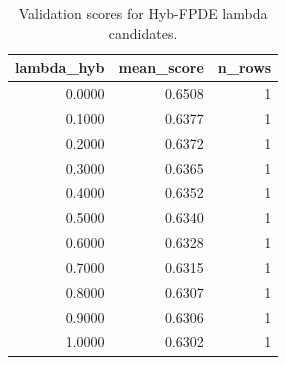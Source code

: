 \begin{table}[t]
\caption{Validation scores for Hyb-FPDE lambda candidates.}
\label{tab:lambda_distribution_computed}
\centering
\begin{tabular}{rrr}
\toprule
lambda\_hyb & mean\_score & n\_rows \\
\midrule
0.0000 & 0.6508 & 1 \\
0.1000 & 0.6377 & 1 \\
0.2000 & 0.6372 & 1 \\
0.3000 & 0.6365 & 1 \\
0.4000 & 0.6352 & 1 \\
0.5000 & 0.6340 & 1 \\
0.6000 & 0.6328 & 1 \\
0.7000 & 0.6315 & 1 \\
0.8000 & 0.6307 & 1 \\
0.9000 & 0.6306 & 1 \\
1.0000 & 0.6302 & 1 \\
\bottomrule
\end{tabular}

\end{table}
